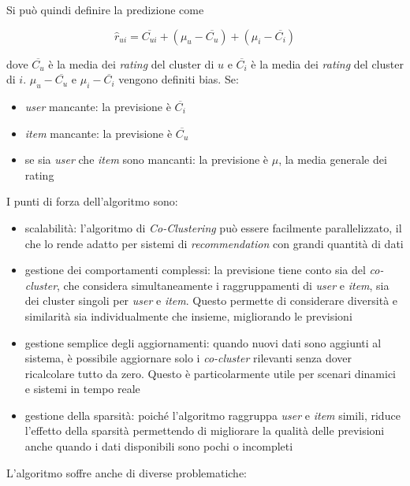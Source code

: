 Si può quindi definire la predizione come

\[
\hat{r}_{ui} = \overline{C_{ui}} + (\mu_u - \overline{C_u}) + (\mu_i - \overline{C_i})
\]

dove $\overline{C_u}$ è la media dei \textit{rating} del cluster di $u$ e $\overline{C_i}$ è la media dei \textit{rating} del cluster di $i$. $ \mu_u - \overline{C_u} $ e $ \mu_i - \overline{C_i} $ vengono definiti bias. Se: 
\begin{itemize}
  \item \textit{user} mancante: la previsione è $ \overline{C_i} $
  \item \textit{item} mancante: la previsione è $ \overline{C_u} $
  \item se sia \textit{user} che \textit{item} sono mancanti: la previsione è $ \mu $, la media generale dei rating
\end{itemize}

I punti di forza dell'algoritmo sono:

\begin{itemize}
  \item scalabilità: l'algoritmo di \textit{Co-Clustering} può essere facilmente parallelizzato, il che lo rende adatto per sistemi di \textit{recommendation} con grandi quantità di dati
  \item gestione dei comportamenti complessi: la previsione tiene conto sia del \textit{co-cluster}, che considera simultaneamente i raggruppamenti di \textit{user} e \textit{item}, sia dei cluster singoli per \textit{user} e \textit{item}. Questo permette di considerare diversità e similarità sia individualmente che insieme, migliorando le previsioni
  \item gestione semplice degli aggiornamenti: quando nuovi dati sono aggiunti al sistema, è possibile aggiornare solo i \textit{co-cluster} rilevanti senza dover ricalcolare tutto da zero. Questo è particolarmente utile per scenari dinamici e sistemi in tempo reale
  \item gestione della sparsità: poiché l'algoritmo raggruppa \textit{user} e \textit{item} simili, riduce l'effetto della sparsità permettendo di migliorare la qualità delle previsioni anche quando i dati disponibili sono pochi o incompleti
\end{itemize}

L'algoritmo soffre anche di diverse problematiche:

